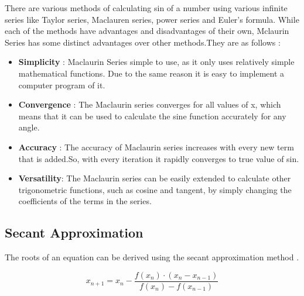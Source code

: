 \documentclass{report}
\begin{document}
    \begin{flushleft}
    There are various methods of calculating sin of a number using various infinite series like Taylor series, Maclauren series, power series and Euler's formula.
    While each of the methods have advantages and disadvantages of their own, Mclaurin Series has some distinct advantages over other methods.They are as follows :
    \end{flushleft}
    \begin{itemize}
      \item \textbf{Simplicity} : Maclaurin Series simple to use, as it only uses relatively simple mathematical functions. Due to the same reason it is easy to implement a computer program of it.
      \item \textbf{Convergence} : The Maclaurin series converges for all values of x, which means that it can be used to calculate the sine function accurately for any angle.
      \item  \textbf{Accuracy} : The accuracy of Maclaurin series increases with every new term that is added.So, with every iteration it rapidly converges to true value of sin.
      \item \textbf{Versatility}: The Maclaurin series can be easily extended to calculate other trigonometric functions, such as cosine and tangent, by simply changing the coefficients of the terms in the series.
    \end{itemize}

  \subsection{Secant Approximation}
    \begin{flushleft}
    The roots of an equation can be derived using the secant approximation method \cite{Wikipedia:SecantMethod}.
    \end{flushleft}
    $$ x_{n+1} = x_n - \frac{f(x_n) \cdot (x_n - x_{n-1})}{f(x_n) - f(x_{n-1})} $$
\end{document}

